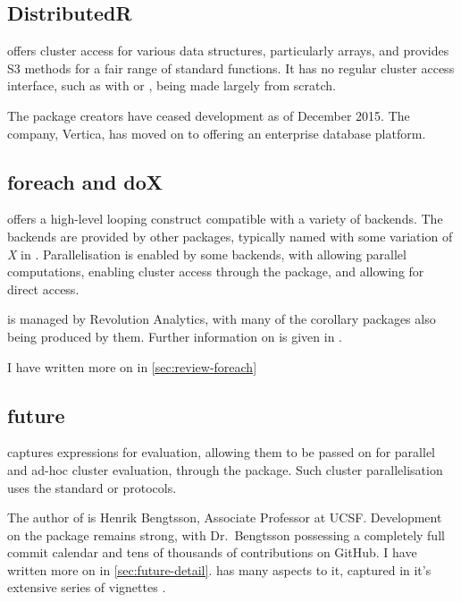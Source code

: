 \subsection{DistributedR}\label{subsec:distributedr}

 offers cluster access for various \R{} data structures,
particularly arrays, and provides S3 methods for a fair range of
standard functions. It has no regular cluster access interface, such as
with  or , being made largely from scratch.

The package creators have ceased development as of December 2015. The
company, Vertica, has moved on to offering an enterprise database
platform\cite{vertica:_distr}.

\subsection{foreach and doX}\label{subsec:foreach-doc}

 offers a high-level looping construct compatible with a variety
of backends\cite{microsoft20}. The backends are provided by other
packages, typically named with some variation of \emph{X} in .
Parallelisation is enabled by some backends, with  allowing
parallel computations\cite{corporation19},  enabling cluster
access through the  package\cite{dosnow19}, and  allowing for
direct  access\cite{weston17}.

 is managed by Revolution Analytics, with many of the 
corollary packages also being produced by them. Further information on
 is given in \cite{weston19:_using}.

I have written more on  in \cref{sec:review-foreach}

\subsection{future}\label{subsec:future-furrr}

 captures \R{} expressions for evaluation, allowing them to be passed
on for parallel and ad-hoc cluster evaluation, through the 
package\cite{bengtsson20}. Such cluster parallelisation uses the standard  or
 protocols.

The author of  is Henrik Bengtsson, Associate Professor at UCSF.
Development on the package remains strong, with Dr.~Bengtsson possessing
a completely full commit calendar and tens of thousands of contributions on GitHub. I
have written more on  in \cref{sec:future-detail}.  has many aspects to it, captured in it's
extensive series of vignettes\cites{bengtsson20:future-r,bengtsson20:future-r2}
\cites{bengtsson20:future-r3,bengtsson20:future-r4,bengtsson20:future-r5,bengtsson20:future-r6}.

